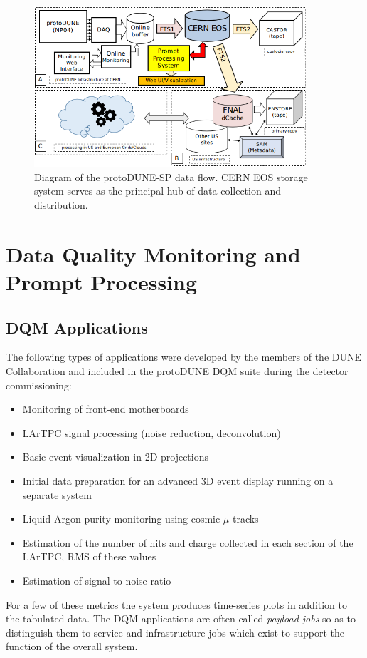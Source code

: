 \documentclass{webofc}
\newcommand{\pd}{protoDUNE\xspace}
\begin{document}
\begin{figure}[tb]
\centering\includegraphics[width=0.9\textwidth]{figures/protoDUNE_data_flow_2018_v1.png}
\caption{\label{fig:dataflow}Diagram of the protoDUNE-SP data flow. CERN EOS storage system serves as the principal hub of data collection and distribution.}
\end{figure}


\section{Data Quality Monitoring and Prompt Processing}
\subsection{DQM Applications}
The following types of applications were developed by the members of the DUNE Collaboration and
included in the \pd DQM suite during the detector
commissioning:
\begin{itemize}
\item Monitoring of front-end motherboards
\item LArTPC signal processing (noise reduction, deconvolution)
\item Basic event visualization in 2D projections
\item Initial data preparation for an advanced 3D event display running on a separate system
\item Liquid Argon purity monitoring using cosmic $\mu$ tracks
\item Estimation of the number of hits and charge collected in each section of the LArTPC, RMS of these values
\item Estimation of signal-to-noise ratio
\end{itemize}

\noindent For a few of these metrics the system produces time-series plots in addition to the tabulated data.
The DQM applications are often called \textit{payload jobs} so as to distinguish
them to service and infrastructure jobs which exist to support the function of the overall system.
\end{document}
